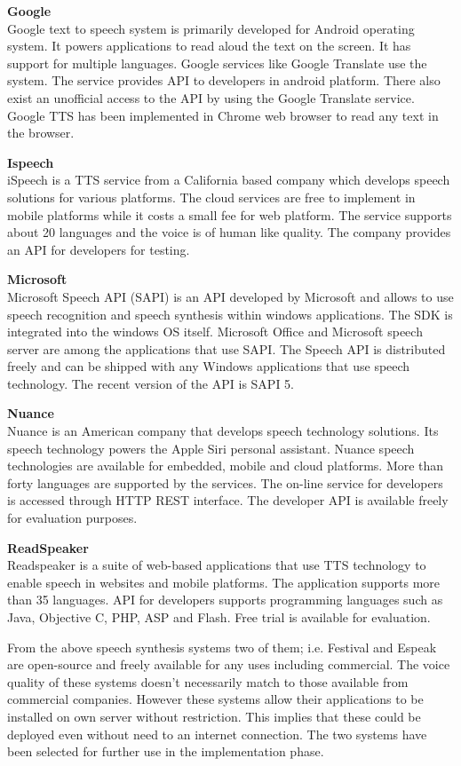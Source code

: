\documentclass[11pt,a4paper,oneside,article]{memoir}
\begin{document}
\textbf{Google}\\
Google text to speech system is primarily developed for Android operating system. It powers applications to read aloud the text on the screen. It has support for multiple languages. Google services like Google Translate use the system. The service provides API to developers in android platform. There also exist an unofficial access to the API by using the Google Translate service. Google TTS has been implemented in Chrome web browser to read any text in the browser. 

\textbf{Ispeech}\\
iSpeech is a TTS service from a California based company which develops speech solutions for various platforms. The cloud services are free to implement in mobile platforms while it costs a small fee for web platform. The service supports about 20 languages and the voice is of human like quality. The company provides an API for developers for testing. \cite{ispeech}

\textbf{Microsoft}\\
Microsoft Speech API (SAPI) is an API developed by Microsoft and allows to use speech recognition and speech synthesis within windows applications. The SDK is integrated into the windows OS itself. Microsoft Office and Microsoft speech server are among the applications that use SAPI. The Speech API is distributed freely and can be shipped with any Windows applications that use speech technology. The recent version of the API is SAPI 5.\cite{microsoft}

\textbf{Nuance}\\
Nuance is an American company that develops speech technology solutions. Its speech technology powers the Apple Siri personal assistant.  Nuance speech technologies are available for embedded, mobile and cloud platforms. More than forty languages are supported by the services. The on-line service for developers is accessed through HTTP REST interface. The developer API is available freely for evaluation purposes. \cite{nuance}

\textbf{ReadSpeaker}\\
Readspeaker is a suite of web-based applications that use TTS technology to enable speech in websites and mobile platforms. The application supports more than 35 languages. API for developers supports programming languages such as Java, Objective C, PHP, ASP and Flash. Free trial is available for evaluation. \cite{readspeaker}

From the above speech synthesis systems two of them; i.e. Festival and Espeak are open-source and freely available for any uses including commercial. The voice quality of these systems doesn't necessarily match to those available from commercial companies. However these systems allow their applications to be installed on own server without restriction. This implies that these could be deployed even without need to an internet connection. The two systems have been selected for further use in the implementation phase.\\
\end{document}
